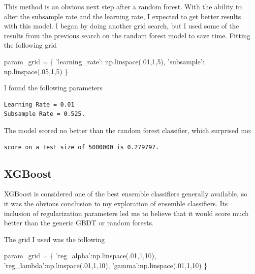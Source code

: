 \documentclass[11pt]{article}
\newenvironment{Shaded}{}{}
\newcommand{\DecValTok}[1]{\textcolor[rgb]{0.25,0.63,0.44}{{#1}}}
\newcommand{\StringTok}[1]{\textcolor[rgb]{0.25,0.44,0.63}{{#1}}}
\newcommand{\NormalTok}[1]{{#1}}
\newcommand{\OperatorTok}[1]{\textcolor[rgb]{0.40,0.40,0.40}{{#1}}}
\begin{document}
This method is an obvious next step after a random forest. With the
ability to alter the subsample rate and the learning rate, I expected to
get better results with this model. I began by doing another grid
search, but I used some of the results from the previous search on the
random forest model to save time. Fitting the following grid

\begin{Shaded}
\begin{Highlighting}[]
\NormalTok{param_grid }\OperatorTok{=}\NormalTok{ \{}
    \StringTok{'learning_rate'}\NormalTok{: np.linspace(.}\DecValTok{01}\NormalTok{,}\DecValTok{1}\NormalTok{,}\DecValTok{5}\NormalTok{),}
    \StringTok{'subsample'}\NormalTok{: np.linspace(.}\DecValTok{05}\NormalTok{,}\DecValTok{1}\NormalTok{,}\DecValTok{5}\NormalTok{)}
\NormalTok{\}}
\end{Highlighting}
\end{Shaded}

I found the following parameters

    \begin{Verbatim}[commandchars=\\\{\}]
Learning Rate = 0.01
Subsample Rate = 0.525.
    \end{Verbatim}

    The model scored no better than the random forest classifier, which surprised me:

    \begin{Verbatim}[commandchars=\\\{\}]
score on a test size of 5000000 is 0.279797.
    \end{Verbatim}

    \hypertarget{xgboost}{%
\subsection{XGBoost}\label{xgboost}}

XGBoost is considered one of the best ensemble classifiers generally available, so it was the obvious conclusion to my exploration of ensemble classifiers. Its inclusion of regularization parameters led me to believe that it would score much better than the generic GBDT or random forests.

The grid I used was the following

\begin{Shaded}
\begin{Highlighting}[]
\NormalTok{param_grid }\OperatorTok{=}\NormalTok{ \{}
    \StringTok{'reg_alpha'}\NormalTok{:np.linspace(.}\DecValTok{01}\NormalTok{,}\DecValTok{1}\NormalTok{,}\DecValTok{10}\NormalTok{),}
    \StringTok{'reg_lambda'}\NormalTok{:np.linspace(.}\DecValTok{01}\NormalTok{,}\DecValTok{1}\NormalTok{,}\DecValTok{10}\NormalTok{),}
    \StringTok{'gamma'}\NormalTok{:np.linspace(.}\DecValTok{01}\NormalTok{,}\DecValTok{1}\NormalTok{,}\DecValTok{10}\NormalTok{)}
\NormalTok{\}}
\end{Highlighting}
\end{Shaded}
\end{document}
